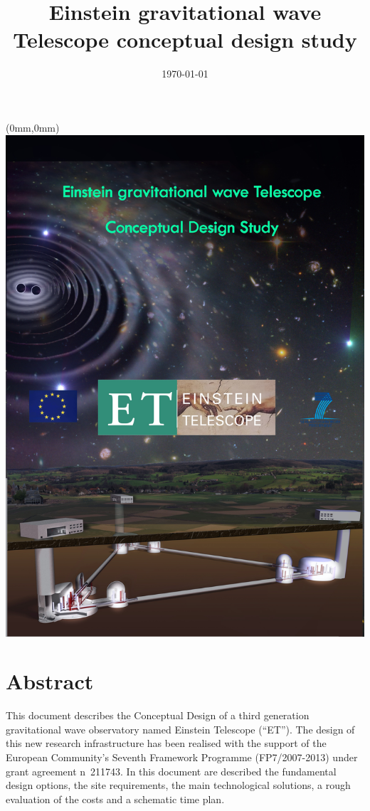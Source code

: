 \documentclass[color,DIV12,pdftex,a4paper]{ET-DS}
\title{Einstein gravitational wave Telescope conceptual design study} \shorttitle{ET Design Study}
\date{\today}
\begin{document}
\begin{textblock*}{300mm}(0mm,0mm)   \includegraphics[width=\paperwidth]{Sec_Conclusions/FirstPagelatest4.jpg}
\end{textblock*}
%
%
\begin{titlepage}
\maketitle
\end{titlepage}
\clearpage
%
\FloatBarrier
%
\section*{Abstract}
This document describes the Conceptual Design of a third generation gravitational wave observatory named Einstein Telescope (``ET''). The design of this new research infrastructure has been realised with the support of the European Community's Seventh Framework
Programme (FP7/2007-2013) under grant agreement n~211743.  In this document are described the fundamental design options, the site requirements, the main technological solutions, a rough evaluation of the costs and a schematic time plan.
%
\vspace{1cm}
\end{document}
